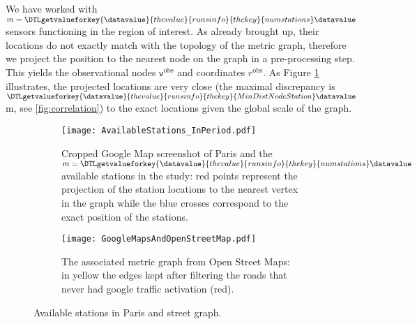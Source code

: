 \documentclass[11pt,a4paper,twoside]{article}
\newcommand{\perplexityinsert}[1]{\DTLgetvalueforkey{\datavalue}{thevalue}{runsinfo}{thekey}{#1}\datavalue}
\newcommand{\asmodif}[2]{{\color{teal} #1} {\sout{#2}}}
\theoremstyle{definition}
\numberwithin{equation}{section}
\newcommand{\bR}{\ensuremath{\mathbb{R}}}
\newcommand{\vv}{\ensuremath{\textsf{v}}}
\newcommand{\<}{\langle}
\renewcommand{\>}{\rangle}
\newcommand{\obs}{\ensuremath{\text{obs}}}
\begin{document}
We have worked with $m=\perplexityinsert{numstations}$ sensors functioning in the region of interest. As already brought up, their locations do not exactly match with the topology of the metric graph, therefore we project the position to the nearest node on the graph in a pre-processing step. This yields the observational nodes $\vv^\obs$ and coordinates $r^\obs$. As Figure \ref{fig:paris-stations} illustrates, the projected locations are very close \asmodif{(the maximal discrepancy is $\perplexityinsert{MinDistNodeStation}$m, see \cref{fig:correlation})}{} to the exact locations given the global scale of the graph. %


\begin{figure}
      \centering
      \begin{subfigure}[b]{0.48\textwidth}
          \centering
          \texttt{[image: AvailableStations\_InPeriod.pdf]}
          \caption{Cropped Google Map screenshot of Paris and the $m=\perplexityinsert{numstations}$ available stations in the study: red points represent the projection of the station locations to the nearest vertex in the graph while the blue crosses correspond to the exact position of the stations.}
          \label{fig:paris-stations}
      \end{subfigure}
      \hfill
      \begin{subfigure}[b]{0.48\textwidth}
          \centering
          \texttt{[image: GoogleMapsAndOpenStreetMap.pdf]}
          \caption{The associated metric graph from Open Street Maps: in yellow the edges kept after filtering the roads that never had google traffic activation (red).}
          \label{fig:paris-graph}
      \end{subfigure}
      \caption{Available stations in Paris and street graph.}
      \label{fig:stations-graph}
 \end{figure}


\end{document}
